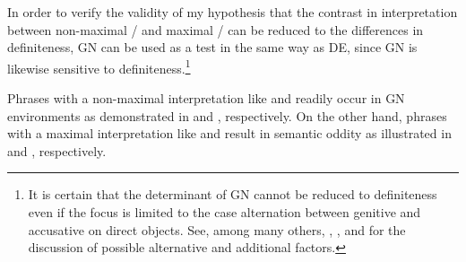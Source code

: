 \documentclass[output=paper]{langscibook}
\begin{document}
In order to verify the validity of my hypothesis that the contrast in interpretation between non-maximal / and maximal / can be reduced to the differences in definiteness, GN can be used as a test in the same way as DE, since GN is likewise sensitive to definiteness.\footnote{It is certain that the determinant of GN cannot be reduced to definiteness even if the focus is limited to the case alternation between genitive and accusative on direct objects. See, among many others, \citet{Timberlake1975}, \citet{Kagan2012}, and \citet{Geist2015} for the discussion of possible alternative and additional factors.
}

Phrases with a non-maximal interpretation like  and  readily occur in GN environments as demonstrated in  and , respectively. On the other hand, phrases with a maximal interpretation like  and  result in semantic oddity as illustrated in  and , respectively.
\end{document}

